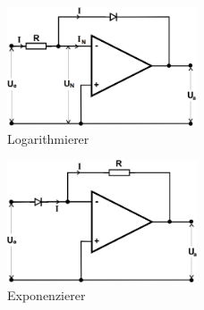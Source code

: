 \begin{figure}
	\centering
	\includegraphics[width=0.5\textwidth]{img/log.png}
	\caption{Logarithmierer \cite{v51}}
	\label{fig:log}
\end{figure}

\begin{figure}
	\centering
	\includegraphics[width=0.5\textwidth]{img/exp.png}
	\caption{Exponenzierer \cite{v51}}
	\label{fig:ep}
\end{figure}
